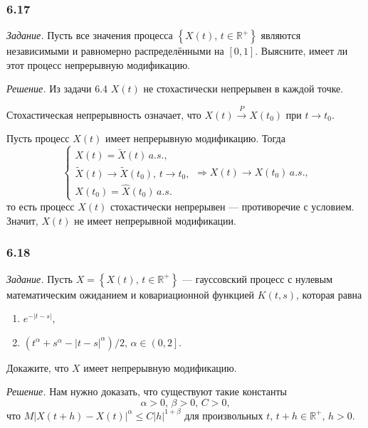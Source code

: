 \subsubsection*{6.17}

\textit{Задание.}
Пусть все значения процесса $ \left\{ X \left( t \right), \, t \in \mathbb{R}^+ \right\} $
являются независимыми и равномерно распределёнными на $ \left[ 0, 1 \right] $.
Выясните, имеет ли этот процесс непрерывную модификацию.

\textit{Решение.}
Из задачи 6.4 $X \left( t \right) $ не стохастически непрерывен в каждой точке.

Стохастическая непрерывность означает,
что $X \left( t \right) \overset{P}{ \to } X \left( t_0 \right) $ при $t \to t_0$.

Пусть процесс $X \left( t \right) $ имеет непрерывную модификацию.
Тогда
$$ \begin{cases}
    X \left( t \right) = \tilde{X} \left( t \right) \, a.s., \\
    \tilde{X} \left( t \right) \to \tilde{X} \left( t_0 \right), \, t \to t_0, \\
    X \left( t_0 \right) = \hat{X} \left( t_0 \right) \, a.s.
  \end{cases} \Rightarrow X \left( t \right) \to X \left( t_0 \right) \, a.s.,$$
то есть процесс $X \left( t \right) $ стохастически непрерывен --- противоречие с условием.
Значит, $X \left( t \right) $ не имеет непрерывной модификации.

\subsubsection*{6.18}

\textit{Задание.}
Пусть $X = \left\{ X \left( t \right), \, t \in \mathbb{R}^+ \right\} $ ---
гауссовский процесс с нулевым математическим ожиданием и ковариационной функцией
$K \left( t, s \right) $, которая равна
\begin{enumerate}[label=\alph*)]
  \item $e^{-\left| t - s \right| }$,
  \item $ \left( t^{ \alpha } + s^{ \alpha } - \left| t - s \right|^{ \alpha } \right) / 2, \,
    \alpha \in \left( 0, 2 \right] $.
\end{enumerate}
Докажите, что $X$ имеет непрерывную модификацию.

\textit{Решение.}
Нам нужно доказать, что существуют такие константы
$$ \alpha > 0, \,
  \beta > 0, \,
  C > 0,$$
что
$M \left| X \left( t + h \right) - X \left( t \right) \right|^{ \alpha} \leq
  C \left| h \right|^{1 + \beta }$
для произвольных $t, \, t + h \in \mathbb{R}^+, \, h > 0$.

